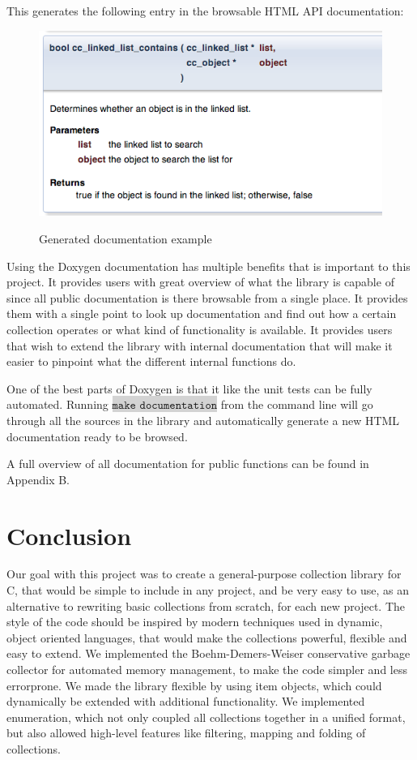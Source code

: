 \documentclass[table]{ituthesis}
\newcommand{\highlight}[1]{\colorbox{lightGray}{$\displaystyle \texttt{#1}$}}
\begin{document}
This generates the following entry in the browsable HTML API documentation:

	\begin{figure}[ht!]
		\begin{center}
			\includegraphics[scale=0.6]{images/doxygen_example.png}
			\label{fig:doxygen_example}
			\caption{Generated documentation example}
		\end{center}
	\end{figure}
	
	Using the Doxygen documentation has multiple benefits that is important to this project. It provides users with great overview of what the library is capable of since all public documentation is there browsable from a single place. It provides them with a single point to look up documentation and find out how a certain collection operates or what kind of functionality is available. It provides users that wish to extend the library with internal documentation that will make it easier to pinpoint what the different internal functions do.
	
	One of the best parts of Doxygen is that it like the unit tests can be fully automated. Running \highlight{make documentation} from the command line will go through all the sources in the library and automatically generate a new HTML documentation ready to be browsed.

	A full overview of all documentation for public functions can be found in Appendix B.

\chapter{Conclusion}

	Our goal with this project was to create a general-purpose collection library for C, that would be simple to include in any project, and be very easy to use, as an alternative to rewriting basic collections from scratch, for each new project. The style of the code should be inspired by modern techniques used in dynamic, object oriented languages, that would make the collections powerful, flexible and easy to extend. We implemented the Boehm-Demers-Weiser conservative garbage collector for automated memory management, to make the code simpler and less errorprone. We made the library flexible by using item objects, which could dynamically be extended with additional functionality. We implemented enumeration, which not only coupled all collections together in a unified format, but also allowed high-level features like filtering, mapping and folding of collections.
	
\end{document}
